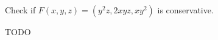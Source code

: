 \begin{exercise}
	Check if $F(x,y,z) = (y^2 z, 2xyz, xy^2)$ is conservative.
\end{exercise}

\begin{solution}
	TODO
\end{solution}
